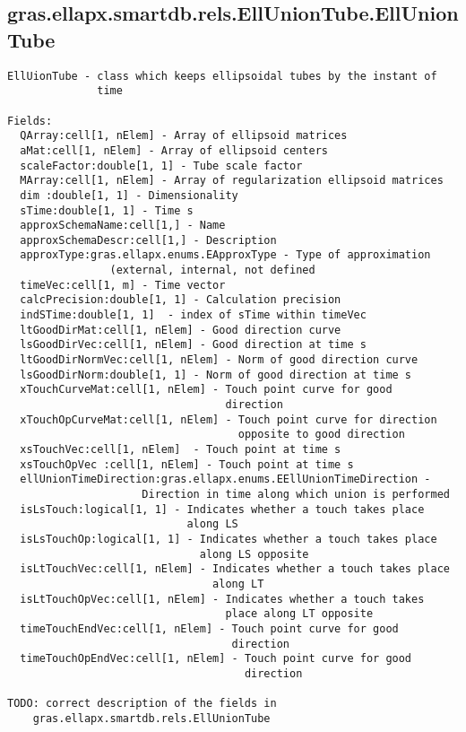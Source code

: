 \subsection{\texorpdfstring{gras.ellapx.smartdb.rels.EllUnionTube.EllUnionTube}{EllUnionTube}}\label{method:gras.ellapx.smartdb.rels.EllUnionTube.EllUnionTube}
\begin{verbatim}
EllUionTube - class which keeps ellipsoidal tubes by the instant of
              time

Fields:
  QArray:cell[1, nElem] - Array of ellipsoid matrices
  aMat:cell[1, nElem] - Array of ellipsoid centers
  scaleFactor:double[1, 1] - Tube scale factor
  MArray:cell[1, nElem] - Array of regularization ellipsoid matrices
  dim :double[1, 1] - Dimensionality
  sTime:double[1, 1] - Time s
  approxSchemaName:cell[1,] - Name
  approxSchemaDescr:cell[1,] - Description
  approxType:gras.ellapx.enums.EApproxType - Type of approximation
                (external, internal, not defined
  timeVec:cell[1, m] - Time vector
  calcPrecision:double[1, 1] - Calculation precision
  indSTime:double[1, 1]  - index of sTime within timeVec
  ltGoodDirMat:cell[1, nElem] - Good direction curve
  lsGoodDirVec:cell[1, nElem] - Good direction at time s
  ltGoodDirNormVec:cell[1, nElem] - Norm of good direction curve
  lsGoodDirNorm:double[1, 1] - Norm of good direction at time s
  xTouchCurveMat:cell[1, nElem] - Touch point curve for good
                                  direction
  xTouchOpCurveMat:cell[1, nElem] - Touch point curve for direction
                                    opposite to good direction
  xsTouchVec:cell[1, nElem]  - Touch point at time s
  xsTouchOpVec :cell[1, nElem] - Touch point at time s
  ellUnionTimeDirection:gras.ellapx.enums.EEllUnionTimeDirection -
                     Direction in time along which union is performed
  isLsTouch:logical[1, 1] - Indicates whether a touch takes place
                            along LS
  isLsTouchOp:logical[1, 1] - Indicates whether a touch takes place
                              along LS opposite
  isLtTouchVec:cell[1, nElem] - Indicates whether a touch takes place
                                along LT
  isLtTouchOpVec:cell[1, nElem] - Indicates whether a touch takes
                                  place along LT opposite
  timeTouchEndVec:cell[1, nElem] - Touch point curve for good
                                   direction
  timeTouchOpEndVec:cell[1, nElem] - Touch point curve for good
                                     direction

TODO: correct description of the fields in
    gras.ellapx.smartdb.rels.EllUnionTube
\end{verbatim}


